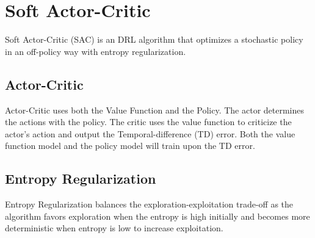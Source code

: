 \section{Soft Actor-Critic}
Soft Actor-Critic (SAC) is an DRL algorithm that optimizes a stochastic policy in an off-policy way with entropy regularization.
\subsection{Actor-Critic}
Actor-Critic uses both the Value Function and the Policy. The actor determines the actions with the policy. The critic uses the value function to criticize the actor's action and output the Temporal-difference (TD) error. Both the value function model and the policy model will train upon the TD error. 

\subsection{Entropy Regularization}
Entropy Regularization balances the exploration-exploitation trade-off as the algorithm favors exploration when the entropy is high initially and becomes more deterministic when entropy is low to increase exploitation.